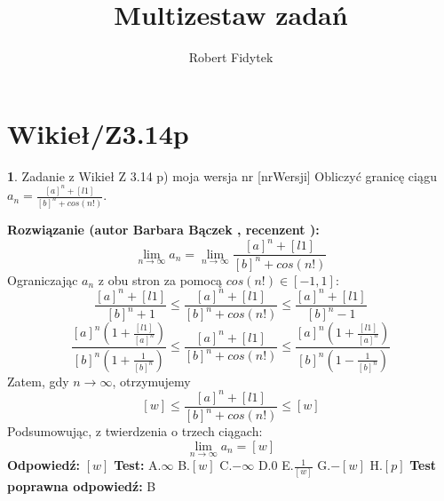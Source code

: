 \documentclass[12pt, a4paper]{article}
\title{Multizestaw zadań}
\author{Robert Fidytek}
\date{}
\theoremstyle{definition} %
\newtheorem{zad}{}
\newcommand{\kategoria}[1]{\section{#1}} %
\newcommand{\zadStart}[1]{\begin{zad}#1\newline} %
\newcommand{\zadStop}{\end{zad}}   %
\newcommand{\rozwStart}[2]{\noindent \textbf{Rozwiązanie (autor #1 , recenzent #2): }\newline} %
\newcommand{\rozwStop}{\newline}                                            %
\newcommand{\odpStart}{\noindent \textbf{Odpowiedź:}\newline}    %
\newcommand{\odpStop}{\newline}                                             %
\newcommand{\testStart}{\noindent \textbf{Test:}\newline} %
\newcommand{\testStop}{\newline} %
\newcommand{\kluczStart}{\noindent \textbf{Test poprawna odpowiedź:}\newline} %
\newcommand{\kluczStop}{\newline} %
\begin{document}
\maketitle


\kategoria{Wikieł/Z3.14p}
\zadStart{Zadanie z Wikieł Z 3.14 p) moja wersja nr [nrWersji]}
Obliczyć granicę ciągu $a_n= \frac{{[a]}^n + [l1]}{{[b]}^n + cos(n!)}$.
\zadStop
\rozwStart{Barbara Bączek}{}
$$\lim_{n \rightarrow \infty} a_n= \lim_{n \rightarrow \infty} \frac{{[a]}^n + [l1]}{{[b]}^n + cos(n!)}$$
Ograniczając $a_n$ z obu stron za pomocą $cos(n!) \in [-1,1]$:
$$ \frac{{[a]}^n + [l1]}{{[b]}^n + 1}  \leq \frac{{[a]}^n + [l1]}{{[b]}^n + cos(n!)} \leq \frac{{[a]}^n + [l1]}{{[b]}^n -1} $$
$$ \frac{{[a]}^n( 1 + \frac{[l1]}{{[a]}^n})}{{[b]}^n( 1 +\frac{1}{{[b]}^n})} \leq \frac{{[a]}^n + [l1]}{{[b]}^n + cos(n!)} \leq \frac{{[a]}^n( 1 + \frac{[l1]}{{[a]}^n})}{{[b]}^n( 1 -\frac{1}{{[b]}^n})}$$
Zatem, gdy $n \rightarrow \infty$, otrzymujemy
$$ [w] \leq  \frac{{[a]}^n + [l1]}{{[b]}^n + cos(n!)} \leq [w] $$
Podsumowując, z twierdzenia o trzech ciągach:  $$\lim_{n \rightarrow \infty} a_n= [w]$$
\rozwStop
\odpStart
$[w]$
\odpStop
\testStart
A.$\infty$
B.$[w]$
C.$-\infty$
D.$0$
E.$\frac{1}{[w]}$
G.$-[w]$
H.$[p]$
\testStop
\kluczStart
B
\kluczStop
\end{document}
